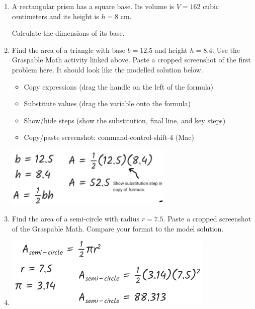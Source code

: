 \begin{enumerate}
\item A rectangular prism has a square base. Its volume is $V=162$ cubic centimeters and its height is $h=8$ cm.
  \begin{multicols}{2}
    Calculate the dimensions of its base.
    \begin{flushright}
    \end{flushright}
  \end{multicols}

\item Find the area of a triangle with base $b=12.5$ and height $h=8.4$. Use the Graspable Math activity linked above. Paste a cropped screenshot of the first problem here. It should look like the modelled solution below.
\begin{itemize}[label=$\square$]
  \item Copy expressions (drag the handle on the left of the formula)
  \item Substitute values (drag the variable onto the formula)
  \item Show/hide steps (show the substitution, final line, and key steps)
  \item Copy/paste screenshot: command-control-shift-4 (Mac)
\end{itemize}
\begin{flushright}
  \includegraphics[width=8cm]{../graphics/04model-solution.png}
\end{flushright}

\item Find the area of a semi-circle with radius $r=7.5$. Paste a cropped screenshot of the Graspable Math. Compare your format to the model solution.
\item \vspace{4cm}
\begin{flushright}
  \includegraphics[width=10cm]{../graphics/04asolution.png}
\end{flushright}


\end{enumerate}

